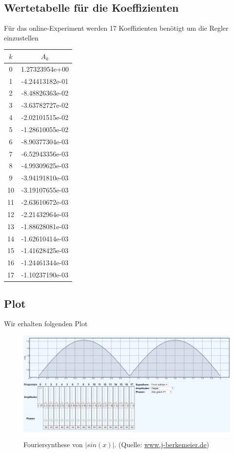 \subsection{Wertetabelle für die Koeffizienten}
Für das online-Experiment werden 17 Koeffizienten benötigt um die
Regler einzustellen 
\begin{table}
  \centering
  \label{tab:koeffizienten}
  \begin{tabular}{c c}
    \toprule
    $k$ & $A_k$\\
    \midrule
      0 & 1.27323954e+00\\
      1 & -4.24413182e-01\\ 
      2 & -8.48826363e-02\\ 
      3 & -3.63782727e-02\\
      4 & -2.02101515e-02\\
      5 & -1.28610055e-02\\ 
      6 & -8.90377304e-03\\
      7 & -6.52943356e-03\\
      8 & -4.99309625e-03\\
      9 & -3.94191810e-03\\
      10 & -3.19107655e-03\\
      11 & -2.63610672e-03\\
      12 & -2.21432964e-03\\
      13 & -1.88628081e-03\\
      14 & -1.62610414e-03\\
      15 & -1.41628425e-03\\
      16 & -1.24461344e-03\\
      17 & -1.10237190e-03\\
    \bottomrule
  \end{tabular}
\end{table}
\newpage
\subsection{Plot}
Wir erhalten folgenden Plot
\begin{figure}
  \centering
  \includegraphics[width=\textwidth]{content/screenshot_phase90}
  \caption{Fouriersynthese von $|sin(x)|$. (Quelle: \href{https://www.j-berkemeier.de/Fouriersynthese.html}{www.j-berkemeier.de})}
  \label{fig:sin}
\end{figure}
